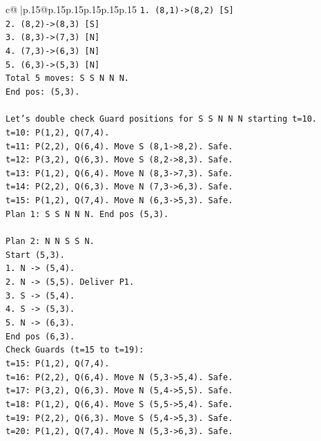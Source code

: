 \documentclass{article}
\begin{document}
{\begin{supertabular}{c@{$\;$}|p{.15\linewidth}@{}p{.15\linewidth}p{.15\linewidth}p{.15\linewidth}p{.15\linewidth}p{.15\linewidth}}
{{{\texttt{1. (8,1){-}>(8,2) {[}S{]}} \\
\texttt{2. (8,2){-}>(8,3) {[}S{]}} \\
\texttt{3. (8,3){-}>(7,3) {[}N{]}} \\
\texttt{4. (7,3){-}>(6,3) {[}N{]}} \\
\texttt{5. (6,3){-}>(5,3) {[}N{]}} \\
\texttt{Total 5 moves: S S N N N.} \\
\texttt{End pos: (5,3).} \\
\\ 
\texttt{Let's double check Guard positions for S S N N N starting t=10.} \\
\texttt{t=10: P(1,2), Q(7,4).} \\
\texttt{t=11: P(2,2), Q(6,4). Move S (8,1{-}>8,2). Safe.} \\
\texttt{t=12: P(3,2), Q(6,3). Move S (8,2{-}>8,3). Safe.} \\
\texttt{t=13: P(1,2), Q(6,4). Move N (8,3{-}>7,3). Safe.} \\
\texttt{t=14: P(2,2), Q(6,3). Move N (7,3{-}>6,3). Safe.} \\
\texttt{t=15: P(1,2), Q(7,4). Move N (6,3{-}>5,3). Safe.} \\
\texttt{Plan 1: S S N N N. End pos (5,3).} \\
\\ 
\texttt{Plan 2: N N S S N.} \\
\texttt{Start (5,3).} \\
\texttt{1. N {-}> (5,4).} \\
\texttt{2. N {-}> (5,5). Deliver P1.} \\
\texttt{3. S {-}> (5,4).} \\
\texttt{4. S {-}> (5,3).} \\
\texttt{5. N {-}> (6,3).} \\
\texttt{End pos (6,3).} \\
\texttt{Check Guards (t=15 to t=19):} \\
\texttt{t=15: P(1,2), Q(7,4).} \\
\texttt{t=16: P(2,2), Q(6,4). Move N (5,3{-}>5,4). Safe.} \\
\texttt{t=17: P(3,2), Q(6,3). Move N (5,4{-}>5,5). Safe.} \\
\texttt{t=18: P(1,2), Q(6,4). Move S (5,5{-}>5,4). Safe.} \\
\texttt{t=19: P(2,2), Q(6,3). Move S (5,4{-}>5,3). Safe.} \\
\texttt{t=20: P(1,2), Q(7,4). Move N (5,3{-}>6,3). Safe.} \\
}}}
\end{supertabular}}
\end{document}
